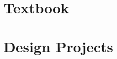 \documentclass[article,A4,12pt]{llncs}
\begin{document}
\newpage
\setcounter{tocdepth}{2}
\tableofcontents


\newpage

\part{Textbook}



\part{Design Projects}


\end{document}
